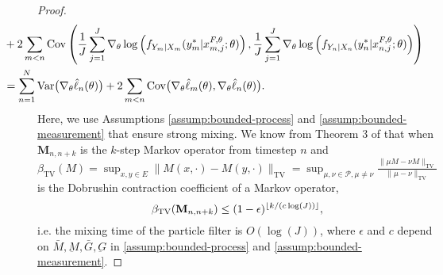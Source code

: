 \begin{proof}
\begin{align}
    &\hspace{-15mm}+ 2\sum_{m<n}\Cov\left(\frac{1}{J}\sum_{j=1}^{J}\nabla_\theta \log\left(f_{Y_m|X_{m}}(y_m^*|x_{m,j}^{F, \theta}; \theta)\right), \frac{1}{J}\sum_{j=1}^{J}\nabla_\theta \log\left(f_{Y_n|X_{n}}(y_n^*|x_{n,j}^{F, \theta}; \theta)\right)\right) \\
    &\hspace{-15mm}= \sum_{n=1}^N \Var\big(\nabla_\theta\hat\ell_n(\theta)\big) + 2\sum_{m<n} \Cov\big(\nabla_\theta\hat\ell_m(\theta),\nabla_\theta\hat\ell_n(\theta)\big).
\end{align}
Here, we use Assumptions \ref{assump:bounded-process} and \ref{assump:bounded-measurement} that ensure strong mixing. We know from Theorem 3 of \cite{karjalainen23} that when $\textbf{M}_{n,n+k}$ is the $k$-step Markov operator from timestep $n$ and $\beta_{\text{TV}}(M) = \sup _{x, y \in E}\|M(x, \cdot)-M(y, \cdot)\|_{\mathrm{TV}}=\sup _{\mu, \nu \in \mathcal{P}, \mu \neq \nu} \frac{\|\mu M-\nu M\|_{\mathrm{TV}}}{\|\mu-\nu\|_{\mathrm{TV}}}$ is the Dobrushin contraction coefficient of a Markov operator, 
\begin{equation}
\beta_{\text{TV}}(\textbf{M}_{n,n+k}) \leq (1-\epsilon)^{\lfloor k/(c\log(J)) \rfloor},
\end{equation}
i.e. the mixing time of the particle filter is $O(\log(J))$, where $\epsilon$ and $c$ depend on $\bar{M}, \underbar{M}, \bar{G}, \underbar{G}$ in \ref{assump:bounded-process} and \ref{assump:bounded-measurement}. 



\end{proof}
